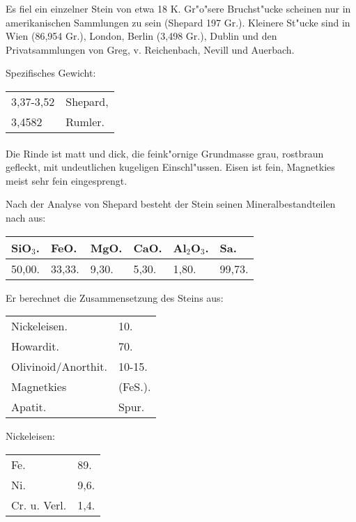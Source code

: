 \documentclass[a4paper, 11pt, oneside]{article}
\begin{document}
Es fiel ein einzelner Stein von etwa 18 K. Gr"o"sere Bruchst"ucke scheinen nur in amerikanischen Sammlungen zu sein (Shepard 197 Gr.). Kleinere St"ucke sind in Wien (86,954 Gr.), London, Berlin (3,498 Gr.), Dublin und den Privatsammlungen von Greg, v. Reichenbach, Nevill und Auerbach.

Spezifisches Gewicht:
\begin{table}[!ht]
    \centering
    \begin{tabular}{l l}
        3,37-3,52 & Shepard,\\
        3,4582 & Rumler.
    \end{tabular}
\end{table}
\paragraph{}
Die Rinde ist matt und dick, die feink"ornige Grundmasse grau, rostbraun gefleckt, mit undeutlichen kugeligen Einschl"ussen. Eisen ist fein, Magnetkies meist sehr fein eingesprengt.

Nach der Analyse von Shepard besteht der Stein seinen Mineralbestandteilen nach aus:
\begin{table}[!ht]
    \centering
    \begin{tabular}{l l l l l l}
        SiO$_{3}$. & FeO. & MgO. & CaO. & Al$_{2}$O$_{3}$. & Sa. \\ \hline
        50,00. & 33,33. & 9,30. & 5,30. & 1,80. & 99,73. \\
    \end{tabular}
\end{table}

Er berechnet die Zusammensetzung des Steins aus:
\begin{table}[H]
    \centering
    \begin{tabular}{l l}
        Nickeleisen. & 10. \\
        Howardit. & 70. \\
        Olivinoid/Anorthit. & 10-15. \\
        Magnetkies & (FeS.). \\
        Apatit. & Spur. \\
    \end{tabular}
\end{table}

Nickeleisen:
\begin{table}[H]
    \centering
    \begin{tabular}{l l}
        Fe. & 89. \\
        Ni. & 9,6. \\
        Cr. u. Verl. & 1,4. \\
    \end{tabular}
\end{table}
\end{document}
